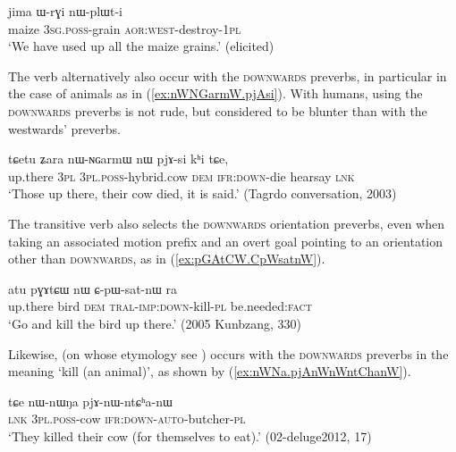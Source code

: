   \begin{exe}
\ex \label{ex:WrGi.nWplWti}
\gll  jima ɯ-rɣi nɯ-plɯt-i \\
maize \textsc{3sg}.\textsc{poss}-grain \textsc{aor}:\textsc{west}-destroy-\textsc{1pl} \\
\glt `We have used up all the maize grains.' (elicited)
  \end{exe} 
  
 The verb  alternatively also occur with the \textsc{downwards} preverbs, in particular in the case of animals as in (\ref{ex:nWNGarmW.pjAsi}). With humans, using the \textsc{downwards} preverbs is not rude, but considered to be blunter than with the  westwards' preverbs.
 
\begin{exe}
\ex \label{ex:nWNGarmW.pjAsi}
\gll  tɕetu ʑara nɯ-ɴɢarmɯ nɯ pjɤ-si kʰi tɕe,  \\
up.there \textsc{3pl} \textsc{3pl}.\textsc{poss}-hybrid.cow \textsc{dem} \textsc{ifr}:\textsc{down}-die hearsay \textsc{lnk} \\
\glt `Those up there, their cow died, it is said.' (Tagrdo conversation, 2003)
   \end{exe} 
   
The transitive verb  also selects the \textsc{downwards} orientation preverbs, even when taking an associated motion prefix and an overt goal pointing to an orientation other than \textsc{downwards}, as in (\ref{ex:pGAtCW.CpWsatnW}).

\begin{exe}
\ex \label{ex:pGAtCW.CpWsatnW}
\gll  atu pɣɤtɕɯ nɯ ɕ-pɯ-sat-nɯ ra \\
up.there bird \textsc{dem} \textsc{tral}-\textsc{imp}:\textsc{down}-kill-\textsc{pl} be.needed:\textsc{fact} \\
\glt `Go and kill the bird up there.' (2005 Kunbzang, 330)
   \end{exe} 
   
Likewise,  (on whose etymology see \citealt[303--309]{gong18these}) occurs with the \textsc{downwards} preverbs in the meaning `kill (an animal)', as shown by (\ref{ex:nWNa.pjAnWnWntChanW}). 

\begin{exe}
\ex \label{ex:nWNa.pjAnWnWntChanW}
\gll  tɕe nɯ-nɯŋa pjɤ-nɯ-ntɕʰa-nɯ \\
\textsc{lnk} \textsc{3pl}.\textsc{poss}-cow \textsc{ifr}:\textsc{down}-\textsc{auto}-butcher-\textsc{pl} \\
\glt `They killed their cow (for themselves to eat).' (02-deluge2012, 17)
\end{exe} 

